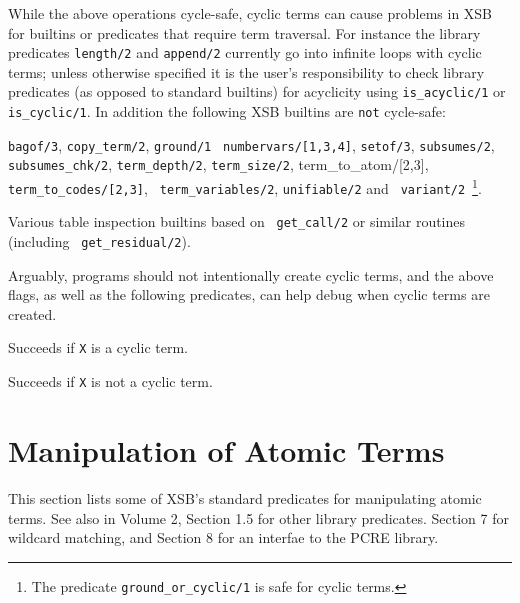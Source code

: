     While the above operations cycle-safe, cyclic terms can cause
    problems in XSB for builtins or predicates that require term
    traversal.  For instance the library predicates {\tt length/2} and
    {\tt append/2} currently go into infinite loops with cyclic terms;
    unless otherwise specified it is the user's responsibility to
    check library predicates (as opposed to standard builtins) for
    acyclicity using {\tt is\_acyclic/1} or {\tt is\_cyclic/1}.  In
    addition the following XSB builtins are {\tt not} cycle-safe:

\bi
\item {\tt bagof/3}, {\tt copy\_term/2}, {\tt ground/1} {\tt
  numbervars/[1,3,4]}, {\tt setof/3}, {\tt subsumes/2}, {\tt
  subsumes\_chk/2}, {\tt term\_depth/2}, {\tt term\_size/2},
  {term\_to\_atom/[2,3]}, {\tt term\_to\_codes/[2,3]}, {\tt
    term\_variables/2}, {\tt unifiable/2} and {\tt
    variant/2}~\footnote{The predicate {\tt ground\_or\_cyclic/1} is
      safe for cyclic terms.}.
%
\item Various table inspection builtins based on {\tt
        get\_call/2} or similar routines (including {\tt
        get\_residual/2}).
\ei

    Arguably, programs should not intentionally create cyclic terms,
    and the above flags, as well as the following predicates, can help
    debug when cyclic terms are created.

\begin{description}
    Succeeds if {\tt X} is a cyclic term.  
\end{description}

\begin{description}
    Succeeds if {\tt X} is not a cyclic term.  
\end{description}

\section{Manipulation of Atomic Terms}

This section lists some of XSB's standard predicates for manipulating
atomic terms.  See also in Volume 2, Section 1.5 for other library
predicates. Section 7 for wildcard matching, and Section 8 for an
interfae to the PCRE library.

